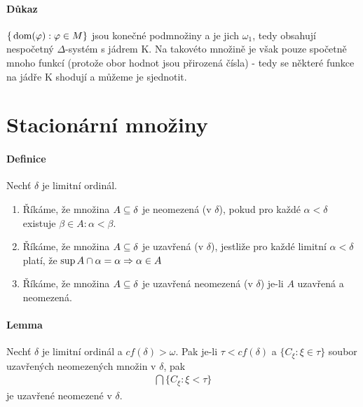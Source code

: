 \documentclass[a4paper,12pt,titlepage]{article}
\begin{document}
\paragraph{Důkaz}
$\{\operatorname*{\,dom}(\varphi) : \varphi \in M\}$ jsou konečné podmnožiny a je jich
$\omega_1$, tedy obsahují nespočetný $\Delta$-systém s jádrem K. Na takovéto
množině je však pouze spočetně mnoho funkcí (protože obor hodnot jsou přirozená
čísla) - tedy se některé funkce na jádře K shodují a můžeme je sjednotit.


\section{Stacionární množiny}
\setcounter{equation}{0}
\paragraph{Definice}
Nechť $\delta$ je limitní ordinál.
\begin{enumerate}
	\item Říkáme, že množina $A \subseteq \delta$ je neomezená (v $\delta$), pokud
	pro každé $\alpha < \delta$ existuje $\beta \in A: \alpha < \beta$.
	\item Říkáme, že množina $A \subseteq \delta$ je uzavřená (v $\delta$),
	jestliže pro každé limitní $\alpha < \delta$ platí, že $\sup A \cap \alpha =
	\alpha \Rightarrow \alpha \in A$
	\item Říkáme, že množina $A \subseteq \delta$ je uzavřená neomezená (v
	$\delta$) je-li $A$ uzavřená a neomezená.
\end{enumerate}


\paragraph{Lemma}
Nechť $\delta$  je limitní ordinál a $cf(\delta) > \omega$. Pak je-li $\tau <
cf(\delta)$ a $\{ C_\xi: \xi \in \tau \}$ soubor uzavřených neomezených množin v
$\delta$, pak 
\begin{align}
	\bigcap \{C_\xi: \xi < \tau \}
\end{align}
je uzavřené neomezené v $\delta$.
\end{document}
